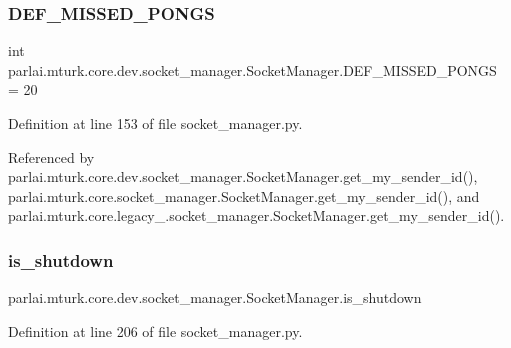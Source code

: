 \subsubsection{\texorpdfstring{D\+E\+F\+\_\+\+M\+I\+S\+S\+E\+D\+\_\+\+P\+O\+N\+GS}{DEF\_MISSED\_PONGS}}
{\footnotesize\ttfamily int parlai.\+mturk.\+core.\+dev.\+socket\+\_\+manager.\+Socket\+Manager.\+D\+E\+F\+\_\+\+M\+I\+S\+S\+E\+D\+\_\+\+P\+O\+N\+GS = 20\hspace{0.3cm}{\ttfamily [static]}}



Definition at line 153 of file socket\+\_\+manager.\+py.



Referenced by parlai.\+mturk.\+core.\+dev.\+socket\+\_\+manager.\+Socket\+Manager.\+get\+\_\+my\+\_\+sender\+\_\+id(), parlai.\+mturk.\+core.\+socket\+\_\+manager.\+Socket\+Manager.\+get\+\_\+my\+\_\+sender\+\_\+id(), and parlai.\+mturk.\+core.\+legacy\+\_.\+socket\+\_\+manager.\+Socket\+Manager.\+get\+\_\+my\+\_\+sender\+\_\+id().

\mbox{\label{classparlai_1_1mturk_1_1core_1_1dev_1_1socket__manager_1_1SocketManager_af6ccd7262adc876b6e752257a7feeb31}} 
\subsubsection{\texorpdfstring{is\+\_\+shutdown}{is\_shutdown}}
{\footnotesize\ttfamily parlai.\+mturk.\+core.\+dev.\+socket\+\_\+manager.\+Socket\+Manager.\+is\+\_\+shutdown}



Definition at line 206 of file socket\+\_\+manager.\+py.



